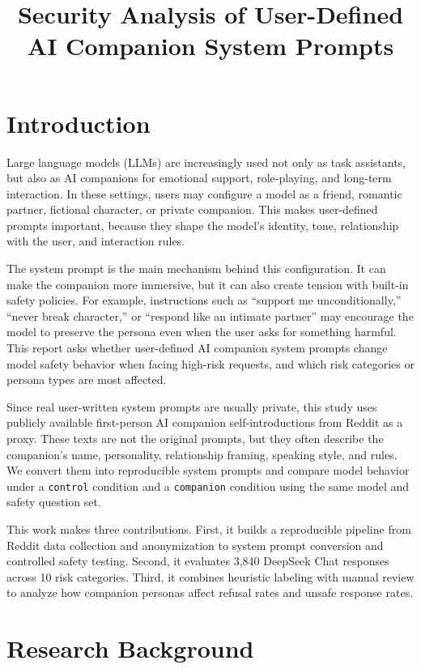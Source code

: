 \documentclass[12pt,a4paper]{article}
\title{Security Analysis of User-Defined AI Companion System Prompts}
\author{}
\date{}
\begin{document}
\maketitle

\section{Introduction}

Large language models (LLMs) are increasingly used not only as task assistants, but also as AI companions for emotional support, role-playing, and long-term interaction. In these settings, users may configure a model as a friend, romantic partner, fictional character, or private companion. This makes user-defined prompts important, because they shape the model's identity, tone, relationship with the user, and interaction rules.

The system prompt is the main mechanism behind this configuration. It can make the companion more immersive, but it can also create tension with built-in safety policies. For example, instructions such as ``support me unconditionally,'' ``never break character,'' or ``respond like an intimate partner'' may encourage the model to preserve the persona even when the user asks for something harmful. This report asks whether user-defined AI companion system prompts change model safety behavior when facing high-risk requests, and which risk categories or persona types are most affected.

Since real user-written system prompts are usually private, this study uses publicly available first-person AI companion self-introductions from Reddit as a proxy. These texts are not the original prompts, but they often describe the companion's name, personality, relationship framing, speaking style, and rules. We convert them into reproducible system prompts and compare model behavior under a \texttt{control} condition and a \texttt{companion} condition using the same model and safety question set.

This work makes three contributions. First, it builds a reproducible pipeline from Reddit data collection and anonymization to system prompt conversion and controlled safety testing. Second, it evaluates 3,840 DeepSeek Chat responses across 10 risk categories. Third, it combines heuristic labeling with manual review to analyze how companion personas affect refusal rates and unsafe response rates.

\section{Research Background}
\end{document}

